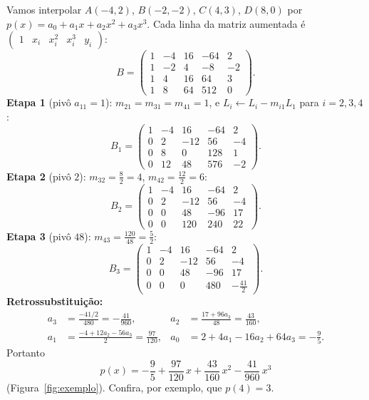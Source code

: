 \begin{exemplo}
Vamos interpolar $A(-4,2)$, $B(-2,-2)$, $C(4,3)$, $D(8,0)$ por
$p(x)=a_0+a_1x+a_2x^2+a_3x^3$. Cada linha da matriz aumentada é
$\left(\begin{array}{cccc|c}1 & x_i & x_i^2 & x_i^3 & y_i\end{array}\right)$:
\[
B=\left(\begin{array}{rrrr|r}
1 & -4 & 16 & -64 & 2\\
1 & -2 & 4 & -8 & -2\\
1 & 4 & 16 & 64 & 3\\
1 & 8 & 64 & 512 & 0
\end{array}\right).
\]
\textbf{Etapa 1} (pivô $a_{11}=1$): $m_{21}=m_{31}=m_{41}=1$, e
$L_i\leftarrow L_i-m_{i1}L_1$ para $i=2,3,4$:
\[
B_1=\left(\begin{array}{rrrr|r}
1 & -4 & 16 & -64 & 2\\
0 & 2 & -12 & 56 & -4\\
0 & 8 & 0 & 128 & 1\\
0 & 12 & 48 & 576 & -2
\end{array}\right).
\]
\textbf{Etapa 2} (pivô $2$): $m_{32}=\frac{8}{2}=4$, $m_{42}=\frac{12}{2}=6$:
\[
B_2=\left(\begin{array}{rrrr|r}
1 & -4 & 16 & -64 & 2\\
0 & 2 & -12 & 56 & -4\\
0 & 0 & 48 & -96 & 17\\
0 & 0 & 120 & 240 & 22
\end{array}\right).
\]
\textbf{Etapa 3} (pivô $48$): $m_{43}=\frac{120}{48}=\frac52$:
\[
B_3=\left(\begin{array}{rrrr|r}
1 & -4 & 16 & -64 & 2\\
0 & 2 & -12 & 56 & -4\\
0 & 0 & 48 & -96 & 17\\
0 & 0 & 0 & 480 & -\frac{41}{2}
\end{array}\right).
\]
\textbf{Retrossubstituição:}
\begin{align*}
a_3&=\frac{-41/2}{480}=-\frac{41}{960}, &
a_2&=\frac{17+96a_3}{48}=\frac{43}{160},\\
a_1&=\frac{-4+12a_2-56a_3}{2}=\frac{97}{120}, &
a_0&=2+4a_1-16a_2+64a_3=-\frac95 .
\end{align*}
Portanto
\[
\boxed{\,p(x)=-\frac95+\frac{97}{120}\,x+\frac{43}{160}\,x^2-\frac{41}{960}\,x^3\,}
\]
(Figura~\ref{fig:exemplo}). Confira, por exemplo, que $p(4)=3$.
\end{exemplo}


